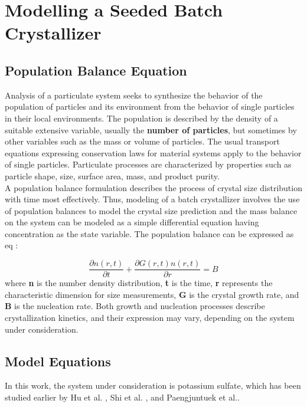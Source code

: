 
\chapter{Modelling a Seeded Batch Crystallizer}


\section{Population Balance Equation}

Analysis of a particulate system seeks to synthesize the behavior of the population of particles and its environment from the behavior of single particles in their local environments. The population is described by the density of a suitable extensive variable, usually the \textbf{number of particles}, but sometimes by other variables such as the mass or volume of particles. The usual transport equations expressing conservation laws for material systems apply to the behavior of single particles. Particulate processes are characterized by properties such as particle shape, size, surface area, mass, and product purity. \\
A population balance formulation describes the process of crystal size distribution with time most effectively. Thus, modeling of a batch crystallizer involves the use of population balances to model the crystal size prediction and the mass balance on the system can be modeled as a simple differential equation having concentration as the state variable.
The population balance can be expressed as eq :

\begin{equation}
	\frac{\partial{n(r,t)}}{\partial{t}} + \frac{\partial{G(r,t)n(r,t)}}{\partial{r}} = B

\end{equation}
where \textbf{n} is the number density distribution, \textbf{t} is the time, \textbf{r} represents the characteristic dimension for size measurements, \textbf{G} is the crystal growth rate, and \textbf{B} is the nucleation rate. Both growth and nucleation processes describe crystallization kinetics, and their expression may vary, depending on the system under consideration.

\section{Model Equations}

In this work, the system under consideration is potassium sulfate, which has been studied earlier by Hu et al. \cite{hu}, Shi et al. \cite{shi}, and Paengjuntuek et al.\cite{paeng}. \\

